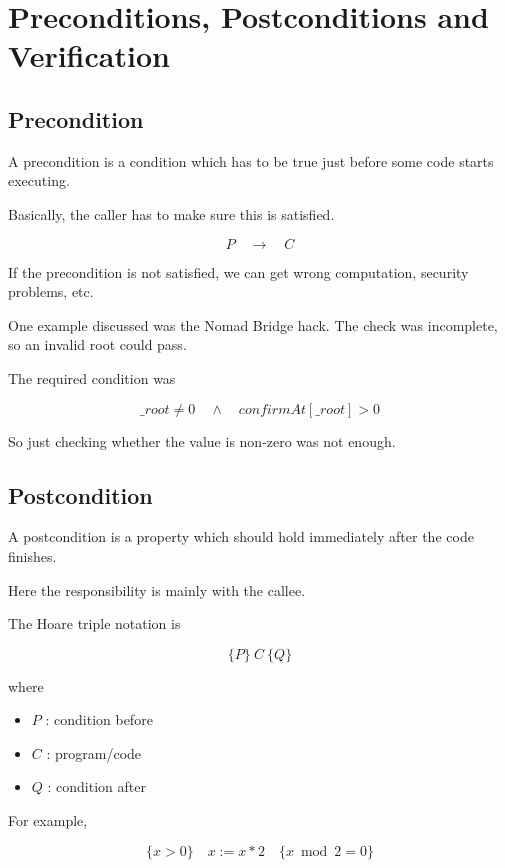 \documentclass[11pt]{book}
\begin{document}
\setcounter{chapter}{1}
\chapter{Preconditions, Postconditions and Verification}



\section{Precondition}

A precondition is a condition which has to be true just before
some code starts executing.

Basically, the caller has to make sure this is satisfied.

\[
P \quad \rightarrow \quad C
\]

If the precondition is not satisfied, we can get wrong
computation, security problems, etc.

\begin{ppnote}
One example discussed was the Nomad Bridge hack.
The check was incomplete, so an invalid root could pass.

The required condition was

\[
\_root \neq 0
\quad\land\quad
confirmAt[\_root] > 0
\]

So just checking whether the value is non-zero was not enough.
\end{ppnote}

\section{Postcondition}

A postcondition is a property which should hold immediately
after the code finishes.

Here the responsibility is mainly with the callee.

The Hoare triple notation is

\[
\{P\}\ C\ \{Q\}
\]

where

\begin{itemize}
    \item $P$ : condition before
    \item $C$ : program/code
    \item $Q$ : condition after
\end{itemize}

For example,

\[
\{x>0\}\quad x:=x*2\quad\{x\bmod 2=0\}
\]
\end{document}
